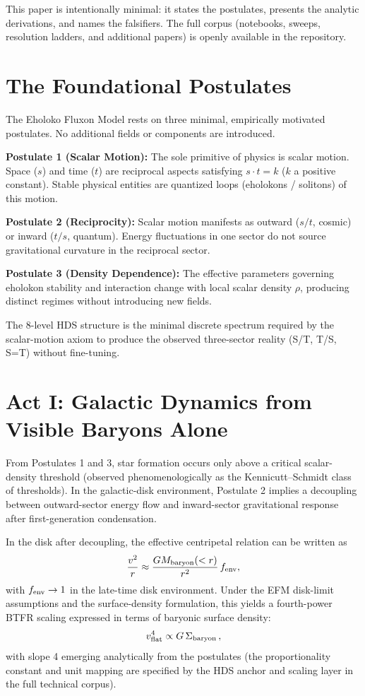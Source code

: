 \documentclass[11pt, twoside]{article}
\begin{document}
This paper is intentionally minimal: it states the postulates, presents the analytic derivations, and names the falsifiers. The full corpus (notebooks, sweeps, resolution ladders, and additional papers) is openly available in the repository.

\section{The Foundational Postulates}
The Eholoko Fluxon Model rests on three minimal, empirically motivated postulates. No additional fields or components are introduced.

\textbf{Postulate 1 (Scalar Motion):} The sole primitive of physics is scalar motion. Space ($s$) and time ($t$) are reciprocal aspects satisfying $s \cdot t = k$ ($k$ a positive constant). Stable physical entities are quantized loops (eholokons / solitons) of this motion.

\textbf{Postulate 2 (Reciprocity):} Scalar motion manifests as outward ($s/t$, cosmic) or inward ($t/s$, quantum). Energy fluctuations in one sector do not source gravitational curvature in the reciprocal sector.

\textbf{Postulate 3 (Density Dependence):} The effective parameters governing eholokon stability and interaction change with local scalar density $\rho$, producing distinct regimes without introducing new fields.

The 8-level HDS structure is the minimal discrete spectrum required by the scalar-motion axiom to produce the observed three-sector reality (S/T, T/S, S=T) without fine-tuning.

\section{Act I: Galactic Dynamics from Visible Baryons Alone}
From Postulates 1 and 3, star formation occurs only above a critical scalar-density threshold (observed phenomenologically as the Kennicutt--Schmidt class of thresholds). In the galactic-disk environment, Postulate 2 implies a decoupling between outward-sector energy flow and inward-sector gravitational response after first-generation condensation.

In the disk after decoupling, the effective centripetal relation can be written as
\[
\frac{v^2}{r} \approx \frac{G M_{\rm baryon}(<r)}{r^2}\, f_{\rm env},
\]
with $f_{\rm env}\to 1$ in the late-time disk environment. Under the EFM disk-limit assumptions and the surface-density formulation, this yields a fourth-power BTFR scaling expressed in terms of baryonic surface density:
\[
v_{\rm flat}^4 \propto G \,\Sigma_{\rm baryon}\,,
\]
with slope 4 emerging analytically from the postulates (the proportionality constant and unit mapping are specified by the HDS anchor and scaling layer in the full technical corpus).
\end{document}
